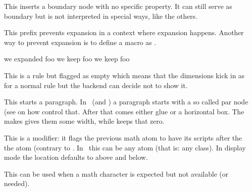 \stopnewprimitive

\startnewprimitive[title={\prm {noboundary}}]

This inserts a boundary node with no specific property. It can still serve as
boundary but is not interpreted in special ways, like the others.

\stopnewprimitive

\startoldprimitive[title={\prm {noexpand}}]

This prefix prevents expansion in a context where expansion happens. Another way
to prevent expansion is to define a macro as .

\startbuffer
          \def\foo{foo} \edef\oof{we expanded      \foo} \meaning\oof
          \def\foo{foo} \edef\oof{we keep \noexpand\foo} \meaning\oof
\protected\def\foo{foo} \edef\oof{we keep          \foo} \meaning\oof
\stopbuffer

\typebuffer

\startlines
\getbuffer
\stoplines

\stopoldprimitive

\startnewprimitive[title={\prm {nohrule}}]

This is a rule but flagged as empty which means that the dimensions kick in as
for a normal rule but the backend can decide not to show it.

\stopnewprimitive

\startoldprimitive[title={\prm {noindent}}]

This starts a paragraph. In \LUATEX\ (and \LUAMETATEX) a paragraph starts with a
so called par node (see  on how control that. After that comes
either  glue or a horizontal box. The  makes gives
them some width, while  keeps that zero.

\stopoldprimitive

\startoldprimitive[title={\prm {nolimits}}]

This is a modifier: it flags the previous math atom to have its scripts after the
the atom (contrary to . In \LUAMETATEX\ this can be any atom (that
is: any class). In display mode the location defaults to above and below.

\stopoldprimitive

\startnewprimitive[title={\prm {nomathchar}}]

This can be used when a math character is expected but not available (or needed).

\stopnewprimitive

